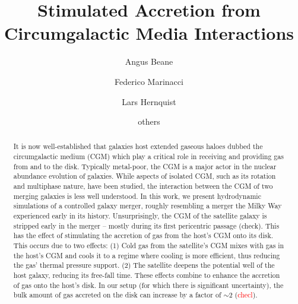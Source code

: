 \documentclass[linenumbers, twocolumn]{aastex631}
\begin{document}
\title{Stimulated Accretion from Circumgalactic Media Interactions}

\author{Angus Beane}

\author{Federico Marinacci}

\author{Lars Hernquist}

\author{others}

\begin{abstract}
  It is now well-established that galaxies host extended gaseous haloes dubbed
  the circumgalactic medium (CGM) which play a critical role in receiving and
  providing gas from and to the disk. Typically metal-poor, the CGM is a major
  actor in the nuclear abundance evolution of galaxies. While aspects of
  isolated CGM, such as its rotation and multiphase nature, have been studied,
  the interaction between the CGM of two merging galaxies is less well
  understood. In this work, we present hydrodynamic simulations of a controlled
  galaxy merger, roughly resembling a merger the Milky Way experienced early in
  its history. Unsurprisingly, the CGM of the satellite galaxy is stripped early
  in the merger -- mostly during its first pericentric passage (check). This has
  the effect of stimulating the accretion of gas from the host's CGM onto its
  disk. This occurs due to two effects: (1) Cold gas from the satellite's CGM
  mixes with gas in the host's CGM and cools it to a regime where cooling is
  more efficient, thus reducing the gas' thermal pressure support. (2) The
  satellite deepens the potential well of the host galaxy, reducing its
  free-fall time. These effects combine to enhance the accretion of gas onto the
  host's disk. In our setup (for which there is significant uncertainty), the
  bulk amount of gas accreted on the disk can increase by a factor of $\sim2$
  (\textcolor{red}{checl}).
\end{abstract}

\end{document}
